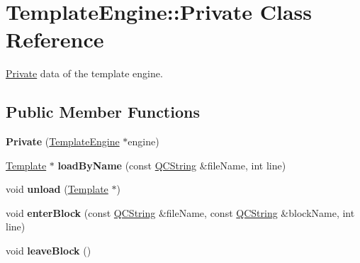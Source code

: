 \hypertarget{class_template_engine_1_1_private}{}\section{Template\+Engine\+::Private Class Reference}
\label{class_template_engine_1_1_private}


\mbox{\hyperlink{class_template_engine_1_1_private}{Private}} data of the template engine.  


\subsection*{Public Member Functions}
\begin{DoxyCompactItemize}
\item 
\mbox{\label{class_template_engine_1_1_private_a573476f02e16963cad2898dc3a98ac9e}} 
{\bfseries Private} (\mbox{\hyperlink{class_template_engine}{Template\+Engine}} $\ast$engine)
\item 
\mbox{\label{class_template_engine_1_1_private_aa17576bb84e91b768291fe06a44c1273}} 
\mbox{\hyperlink{class_template}{Template}} $\ast$ {\bfseries load\+By\+Name} (const \mbox{\hyperlink{class_q_c_string}{Q\+C\+String}} \&file\+Name, int line)
\item 
\mbox{\label{class_template_engine_1_1_private_ad0f02281d0062d8b227b93c5b5e41ce5}} 
void {\bfseries unload} (\mbox{\hyperlink{class_template}{Template}} $\ast$)
\item 
\mbox{\label{class_template_engine_1_1_private_ac0e733a030a716b6b5dd1900638d29fd}} 
void {\bfseries enter\+Block} (const \mbox{\hyperlink{class_q_c_string}{Q\+C\+String}} \&file\+Name, const \mbox{\hyperlink{class_q_c_string}{Q\+C\+String}} \&block\+Name, int line)
\item 
\mbox{\label{class_template_engine_1_1_private_a72b28eb7694ad55a48b6bdf49b72b636}} 
void {\bfseries leave\+Block} ()
\item 
\mbox{\label{class_template_engine_1_1_private_af064c0b6d7a3d74900e9c0dc675de952}} 

\end{DoxyCompactItemize}
